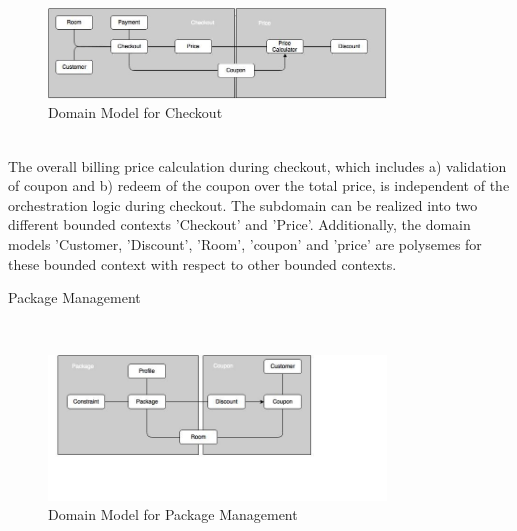 \\
\begin{figure}[H]
\begin{center}
\includegraphics[width=0.8\textwidth]{figures/domain-driven-design-four}
\caption{Domain Model for Checkout}
\label{fig:domain_driven_design/example_scenario/subdomains/checkout}
\end{center}
\end{figure}
\\
The overall billing price calculation during checkout, which includes a) validation of coupon and b) redeem of the coupon over the total price, is independent of the orchestration logic during checkout. The subdomain can be realized into two different bounded contexts 'Checkout' and 'Price'. Additionally, the domain models 'Customer, 'Discount', 'Room', 'coupon' and 'price' are polysemes for these bounded context with respect to other bounded contexts.\\
\begin{shaded} Package Management \end{shaded}
\\
\begin{figure}[H]
\begin{center}
\includegraphics[width=0.8\textwidth]{figures/domain-driven-design-five}
\caption{Domain Model for Package Management}
\label{fig:domain_driven_design/example_scenario/subdomains/package-management}
\end{center}
\end{figure}
\\
